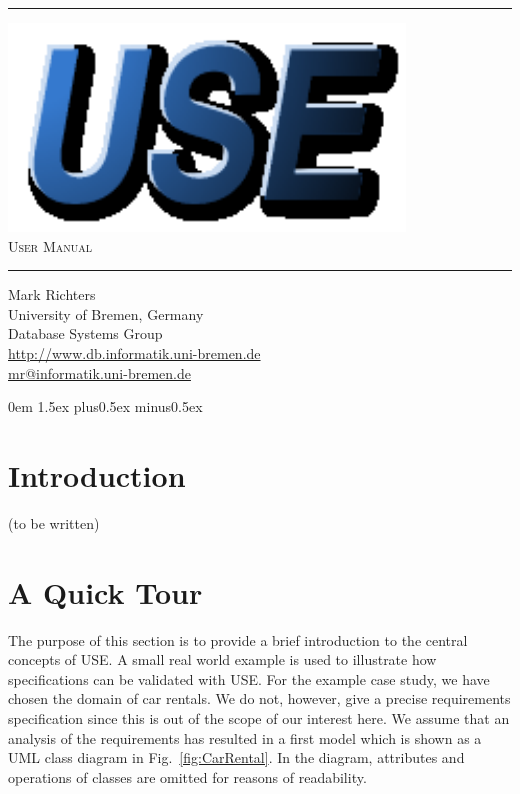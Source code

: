 \documentclass[11pt,a4paper]{article}
\newcommand{\USE}{USE}
\begin{document}

\rule{\linewidth}{1mm}
\begin{flushright}
\includegraphics[scale=0.6]{use1}\\
\Huge \textsc{User Manual}
\end{flushright}
\rule{\linewidth}{1mm}


Mark Richters \\
University of Bremen, Germany \\
Database Systems Group \\
\url{http://www.db.informatik.uni-bremen.de}\\
\url{mr@informatik.uni-bremen.de}\\


\newpage
\tableofcontents


\newpage

\parindent0em
\parskip1.5ex plus0.5ex minus0.5ex

\section{Introduction}

(to be written)

\section{A Quick Tour}

The purpose of this section is to provide a brief introduction to the
central concepts of \USE{}. A small real world example is used to
illustrate how specifications can be validated with \USE{}. For the
example case study, we have chosen the domain of car rentals. We do
not, however, give a precise requirements specification since this is
out of the scope of our interest here. We assume that an analysis of
the requirements has resulted in a first model which is shown as a UML
class diagram in Fig.~\ref{fig:CarRental}. In the diagram, attributes
and operations of classes are omitted for reasons of readability.
\end{document}
